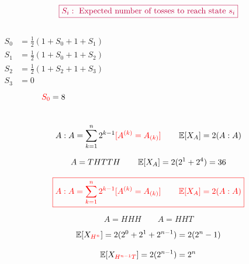 \begin{frame}{}

  \pause
  \vspace{-0.30cm}
  \[
    \textcolor{purple}{\boxed{S_i: \text{ Expected number of tosses to reach state } s_i}}
  \]

  \begin{columns}
      \pause
      \begin{align*}
	S_0 &= \frac{1}{2}(1 + S_0 + 1 + S_1) \\
	S_1 &= \frac{1}{2}(1 + S_0 + 1 + S_2) \\
	S_2 &= \frac{1}{2}(1 + S_2 + 1 + S_3) \\
	S_3 &= 0
      \end{align*}
      \pause
      \[
	\textcolor{red}{S_0} = 8
      \]
  \end{columns}
\end{frame}

\begin{frame}{}


\end{frame}

\begin{frame}{}
  \[
    A : A = \sum_{k=1}^{n} 2^{k-1} \textcolor{red}{[A^{(k)} = A_{(k)}]} \qquad \operatorname*{\mathbb{E}}[X_{A}] = 2 (A : A)
  \]

  \pause
  \vspace{-0.30cm}

  \pause
  \[
    A = THTTH \qquad \operatorname*{\mathbb{E}}[X_A] = 2(2^1 + 2^4) = 36
  \]

\end{frame}

\begin{frame}{}
  \[
    \textcolor{red}{\boxed{A : A = \sum_{k=1}^{n} 2^{k-1} [A^{(k)} = A_{(k)}] \qquad \operatorname*{\mathbb{E}}[X_{A}] = 2 (A : A)}}
  \]

  \pause
  \vspace{0.30cm}
  \[
    A = HHH \qquad A = HHT
  \]

  \pause
  \vspace{0.30cm}
  \[
    \operatorname*{\mathbb{E}}[X_{\textcolor{red}{H^n}}] = 2(2^0 + 2^1 + 2^{n-1}) = 2(2^n - 1)
  \]

  \pause
  \vspace{0.30cm}
  \[
    \operatorname*{\mathbb{E}}[X_{\textcolor{red}{H^{n-1} T}}] = 2(2^{n-1}) = 2^n
  \]
\end{frame}

